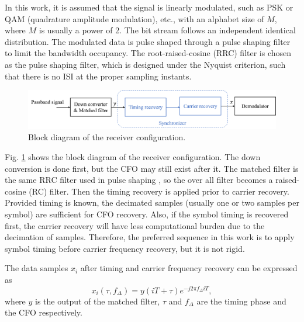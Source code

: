 \documentclass[journal,comsoc]{IEEEtran}
\begin{document}

In this work, it is assumed that the signal is linearly modulated, such as PSK or QAM (quadrature amplitude modulation), etc., with an alphabet size of \(M\), where \(M\) is usually a power of 2.
The bit stream follows an independent identical distribution.
The modulated data is pulse shaped through a pulse shaping filter to limit the bandwidth occupancy.
The root-raised-cosine (RRC) filter is chosen as the pulse shaping filter, which is designed under the Nyquist criterion, 
such that there is no ISI at the proper sampling instants.
\begin{figure}[ht]
\centering
\includegraphics[width=5.5 in]{pic/sys_conf.png}
\caption{Block diagram of the receiver configuration.}
\label{fig:sysconf} 
\end{figure}

Fig. \ref{fig:sysconf} shows the block diagram of the receiver configuration.
The down conversion is done first, but the CFO may still exist after it.
The matched filter is the same RRC filter used in pulse shaping , so the over all filter becomes a raised-cosine (RC) filter. 
Then the timing recovery is applied prior to carrier recovery.
Provided timing is known, the decimated samples (usually one or two samples per symbol) are sufficient for CFO recovery.
Also, if the symbol timing is recovered first, the carrier recovery will have less computational burden due to the decimation of samples.
Therefore, the preferred sequence in this work is to apply symbol timing before carrier frequency recovery, but it is not rigid.

The data samples \(x_i\) after timing and carrier frequency recovery can be expressed as
\begin{equation}
{x_i}( \tau ,{f_\Delta }) = y(iT +  \tau ){e^{ - j2\pi {f_\Delta }iT}},
\end{equation}
where \(y\) is the output of the matched filter, \(\tau\) and \(f_\Delta\) are the timing phase and the CFO respectively.
\end{document}
